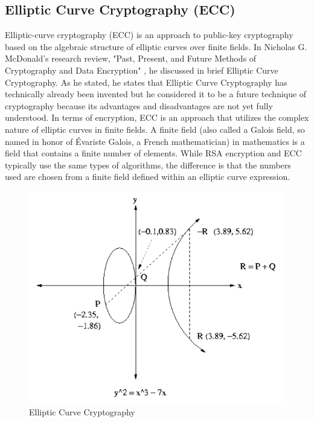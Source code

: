 \documentclass[journal]{IEEEtran}
\begin{document}
\subsection{\textbf{Elliptic Curve Cryptography (ECC)}}
Elliptic-curve cryptography (ECC) is an approach to public-key cryptography based on the algebraic structure of elliptic curves over finite fields. In Nicholas G. McDonald's research review, "Past, Present, and Future Methods of Cryptography and Data Encryption" \cite{encryption_research}, he discussed in brief Elliptic Curve Cryptography. As he stated, he states that Elliptic Curve Cryptography has technically already been invented but he considered it to be a future technique of cryptography because its advantages and disadvantages are not yet fully understood. In terms of encryption, ECC is an approach that utilizes the complex nature of elliptic curves in finite fields. A finite field (also called a Galois field, so named in honor of Évariste Galois, a French mathematician) in mathematics is a field that contains a finite number of elements. While RSA encryption and ECC typically use the same types of algorithms, the difference is that the numbers used are chosen from a finite field defined within an elliptic curve expression.

\newline
\begin{figure}[!h]
    \centering
    \includegraphics[scale=.5]{elliptic_curve}
    \caption{Elliptic Curve Cryptography}
    \label{fig:ecc}
\end{figure}
\end{document}
